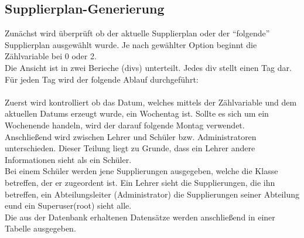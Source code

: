 \subsection{Supplierplan-Generierung}

Zunächst wird überprüft ob der aktuelle Supplierplan oder der \enquote{folgende} Supplierplan ausgewählt wurde. Je nach gewählter Option beginnt die Zählvariable bei 0 oder 2.\\
Die Ansicht ist in zwei Berieche (divs) unterteilt. Jedes div stellt einen Tag dar.\\
Für jeden Tag wird der folgende Ablauf durchgeführt:\\\\
Zuerst wird kontrolliert ob das Datum, welches mittels der Zählvariable und dem aktuellen Datums erzeugt wurde, ein Wochentag ist. Sollte es sich um ein Wochenende handeln, wird der darauf folgende Montag verwendet.\\
Anschließend wird zwischen Lehrer und Schüler bzw. Administratoren unterschieden. Dieser Teilung liegt zu Grunde, dass ein Lehrer andere Informationen sieht als ein Schüler.
\\
Bei einem Schüler werden jene Supplierungen ausgegeben, welche die Klasse betreffen, der er zugeordent ist. Ein Lehrer sieht die Supplierungen, die ihn betreffen, ein Abteilungsleiter (Administrator) die Supplierungen seiner Abteilung eund ein Superuser(root) sieht alle.\\
Die aus der Datenbank erhaltenen Datensätze werden anschließend in einer Tabelle ausgegeben.

%
%
%
% 
%
